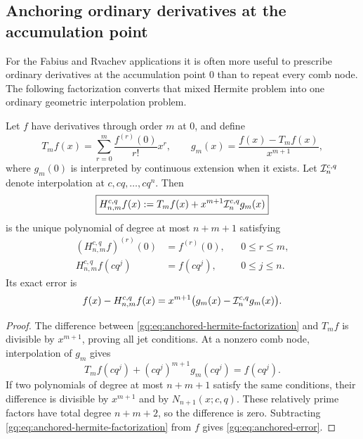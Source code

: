 \subsection{Anchoring ordinary derivatives at the accumulation point}
\label{gq:sec:anchored-hermite}

For the Fabius and Rvachev applications it is often more useful to prescribe
ordinary derivatives at the accumulation point $0$ than to repeat every
comb node.  The following factorization converts that mixed Hermite problem
into one ordinary geometric interpolation problem.

\begin{theorem}
\label{gq:thm:anchored-hermite}
Let $f$ have derivatives through order $m$ at $0$, and define
\begin{equation}
 T_mf(x)=\sum_{r=0}^{m}\frac{f^{(r)}(0)}{r!}x^r,
 \qquad
 g_m(x)=\frac{f(x)-T_mf(x)}{x^{m+1}},
 \label{gq:eq:anchored-g-definition}
\end{equation}
where $g_m(0)$ is interpreted by continuous extension when it exists.  Let
$\mathcal I_n^{c,q}$ denote interpolation at $c,cq,\ldots,cq^n$.  Then
\begin{equation}
 \boxed{
 H_{n,m}^{c,q}f(x)
 :=T_mf(x)+x^{m+1}\mathcal I_n^{c,q}g_m(x)}
 \label{gq:eq:anchored-hermite-factorization}
\end{equation}
is the unique polynomial of degree at most $n+m+1$ satisfying
\begin{align}
 (H_{n,m}^{c,q}f)^{(r)}(0)&=f^{(r)}(0),
 &&0\le r\le m,
 \label{gq:eq:anchored-jet-conditions}\\
 H_{n,m}^{c,q}f(cq^j)&=f(cq^j),
 &&0\le j\le n.
 \label{gq:eq:anchored-value-conditions}
\end{align}
Its exact error is
\begin{equation}
 f(x)-H_{n,m}^{c,q}f(x)
 =x^{m+1}\bigl(g_m(x)-\mathcal I_n^{c,q}g_m(x)\bigr).
 \label{gq:eq:anchored-error}
\end{equation}
\end{theorem}

\begin{proof}
The difference between \eqref{gq:eq:anchored-hermite-factorization} and
$T_mf$ is divisible by $x^{m+1}$, proving all jet conditions.  At a nonzero
comb node, interpolation of $g_m$ gives
\[
 T_mf(cq^j)+(cq^j)^{m+1}g_m(cq^j)=f(cq^j).
\]
If two polynomials of degree at most $n+m+1$ satisfy the same conditions,
their difference is divisible by $x^{m+1}$ and by
$N_{n+1}(x;c,q)$.  These relatively prime factors have total degree
$n+m+2$, so the difference is zero.  Subtracting
\eqref{gq:eq:anchored-hermite-factorization} from $f$ gives
\eqref{gq:eq:anchored-error}.
\end{proof}


